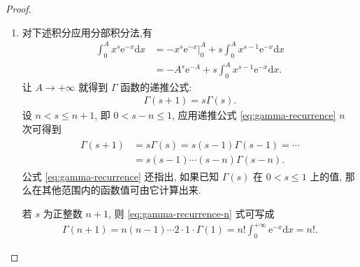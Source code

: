\documentclass[../../main.tex]{subfiles}%
\begin{document}
\begin{proof}
\begin{enumerate}[(1)]
\item 对下述积分应用分部积分法,有
\begin{align*}
\int_{0}^{A} x^s \mathrm{e}^{-x} \mathrm{d}x &= -x^s \mathrm{e}^{-x} \bigg|_{0}^{A} + s\int_{0}^{A} x^{s-1} \mathrm{e}^{-x} \mathrm{d}x \\
&= -A^s \mathrm{e}^{-A} + s\int_{0}^{A} x^{s-1} \mathrm{e}^{-x} \mathrm{d}x.
\end{align*}
让 $A\to+\infty$ 就得到 $\Gamma$ 函数的递推公式:
\begin{align}
\Gamma(s+1) = s\Gamma(s). \label{eq:gamma-recurrence}
\end{align}
设 $n < s \leqslant n+1$, 即 $0 < s-n \leqslant 1$, 应用递推公式 \eqref{eq:gamma-recurrence} $n$ 次可得到
\begin{align}
\begin{split}
\Gamma(s+1) &= s\Gamma(s) = s(s-1)\Gamma(s-1) = \cdots \\
&= s(s-1)\cdots(s-n)\Gamma(s-n). \label{eq:gamma-recurrence-n}
\end{split}
\end{align}
公式 \eqref{eq:gamma-recurrence} 还指出, 如果已知 $\Gamma(s)$ 在 $0<s\leqslant 1$ 上的值, 那么在其他范围内的函数值可由它计算出来.

若 $s$ 为正整数 $n+1$, 则 \eqref{eq:gamma-recurrence-n} 式可写成
\begin{align*}
\Gamma(n+1) = n(n-1)\cdots2\cdot1\cdot\Gamma(1) = n! \int_{0}^{+\infty} \mathrm{e}^{-x} \mathrm{d}x = n!. 
\end{align*}
\end{enumerate}

\end{proof}
\end{document}
